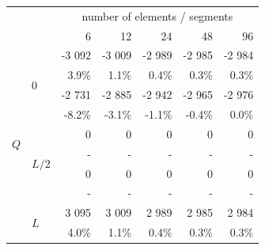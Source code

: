 \begin{figure}[p]
	\centering
	\begin{fullpage}
\begin{tabularx}{0.65\textwidth}{@{} XX rrrrr@{}}
\toprule
& & \multicolumn{5}{c}{number of elements / segments} \\ \cmidrule{3-7}
&  &  6 & 12 & 24 & 48 & 96 \\
\midrule
\multirow{12}{*}{$Q$}&\multirow{4}{*}{$0$}&{\color{Tblue}\normalsize-3 092}&{\color{Tblue}\normalsize-3 009}&{\color{Tblue}\normalsize-2 989}&{\color{Tblue}\normalsize-2 985}&{\color{Tblue}\normalsize-2 984}\\
&&{\color{Tblue}\scriptsize3.9\%}&{\color{Tblue}\scriptsize1.1\%}&{\color{Tblue}\scriptsize0.4\%}&{\color{Tblue}\scriptsize0.3\%}&{\color{Tblue}\scriptsize0.3\%}\\
&&{\color{black}\normalsize-2 731}&{\color{black}\normalsize-2 885}&{\color{black}\normalsize-2 942}&{\color{black}\normalsize-2 965}&{\color{black}\normalsize-2 976}\\
&&{\color{black}\scriptsize-8.2\%}&{\color{black}\scriptsize-3.1\%}&{\color{black}\scriptsize-1.1\%}&{\color{black}\scriptsize-0.4\%}&{\color{black}\scriptsize0.0\%}\\\cmidrule[0.5\cmidrulewidth]{2-7}
&\multirow{4}{*}{$L/2$}&{\color{Tblue}\normalsize 0}&{\color{Tblue}\normalsize 0}&{\color{Tblue}\normalsize 0}&{\color{Tblue}\normalsize 0}&{\color{Tblue}\normalsize 0}\\
&&{\color{Tblue}\scriptsize-}&{\color{Tblue}\scriptsize-}&{\color{Tblue}\scriptsize-}&{\color{Tblue}\scriptsize-}&{\color{Tblue}\scriptsize-}\\
&&{\color{black}\normalsize 0}&{\color{black}\normalsize 0}&{\color{black}\normalsize 0}&{\color{black}\normalsize 0}&{\color{black}\normalsize 0}\\
&&{\color{black}\scriptsize-}&{\color{black}\scriptsize-}&{\color{black}\scriptsize-}&{\color{black}\scriptsize-}&{\color{black}\scriptsize-}\\\cmidrule[0.5\cmidrulewidth]{2-7}
&\multirow{4}{*}{$L$}&{\color{Tblue}\normalsize3 095}&{\color{Tblue}\normalsize3 009}&{\color{Tblue}\normalsize2 989}&{\color{Tblue}\normalsize2 985}&{\color{Tblue}\normalsize2 984}\\
&&{\color{Tblue}\scriptsize4.0\%}&{\color{Tblue}\scriptsize1.1\%}&{\color{Tblue}\scriptsize0.4\%}&{\color{Tblue}\scriptsize0.3\%}&{\color{Tblue}\scriptsize0.3\%}\\

\end{tabularx}
\end{fullpage}
\end{figure}
